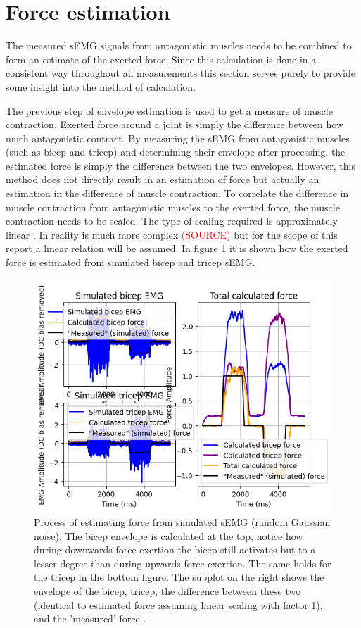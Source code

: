 \section{Force estimation}\label{section:force_estimation}

The measured sEMG signals from antagonistic muscles needs to be combined to form an estimate of the exerted force. Since this calculation is done in a consistent way throughout all measurements this section serves purely to provide some insight into the method of calculation.

The previous step of envelope estimation is used to get a measure of muscle contraction. Exerted force around a joint is simply the difference between how much antagonistic contract. By measuring the sEMG from antagonistic muscles (such as bicep and tricep) and determining their envelope after processing, the estimated force is simply the difference between the two envelopes. However, this method does not directly result in an estimation of force but actually an estimation in the difference of muscle contraction. To correlate the difference in muscle contraction from antagonistic muscles to the exerted force, the muscle contraction needs to be scaled. The type of scaling required is approximately linear \cite{adaptive_filter_dry_electrode}. In reality is much more complex \textcolor{red}{(SOURCE)} but for the scope of this report a linear relation will be assumed. In figure \ref{fig:force_simulation} it is shown how the exerted force is estimated from simulated bicep and tricep sEMG. 

\begin{figure}[h!t]
	\begin{center}
		\includegraphics[width=0.7\columnwidth]{images/force_simulation.png}
	\end{center}
	\caption{Process of estimating force from simulated sEMG (random Gaussian noise). The bicep envelope is calculated at the top, notice how during downwards force exertion the bicep still activates but to a lesser degree than during upwards force exertion. The same holds for the tricep in the bottom figure. The subplot on the right shows the envelope of the bicep, tricep, the difference between these two (identical to estimated force assuming linear scaling with factor 1), and the 'measured' force .}
	\label{fig:force_simulation}
\end{figure}

